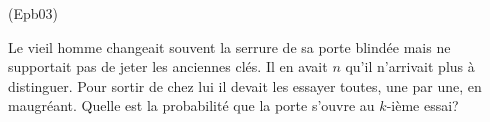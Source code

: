 \begin{tiny}(Epb03)\end{tiny} Le vieil homme changeait souvent la serrure de sa porte blindée mais ne supportait pas de jeter les anciennes clés. Il en avait $n$ qu'il n'arrivait plus à distinguer. Pour sortir de chez lui il devait les essayer toutes, une par une, en maugréant.\newline
Quelle est la probabilité que la porte s'ouvre au $k$-ième essai?  